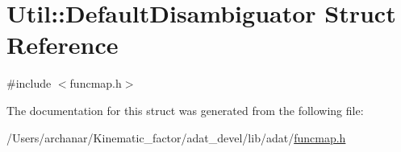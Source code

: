 \hypertarget{structUtil_1_1DefaultDisambiguator}{}\section{Util\+:\+:Default\+Disambiguator Struct Reference}
\label{structUtil_1_1DefaultDisambiguator}


{\ttfamily \#include $<$funcmap.\+h$>$}



The documentation for this struct was generated from the following file\+:\begin{DoxyCompactItemize}
\item 
/\+Users/archanar/\+Kinematic\+\_\+factor/adat\+\_\+devel/lib/adat/\mbox{\hyperlink{lib_2adat_2funcmap_8h}{funcmap.\+h}}\end{DoxyCompactItemize}

